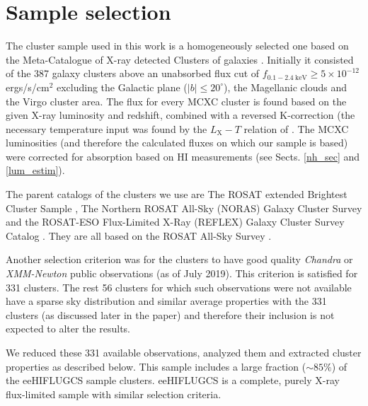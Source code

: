 \documentclass{aa}   %
\begin{document}


\section{Sample selection} \label{eehifl}

The cluster sample used in this work is a homogeneously selected one based on the Meta-Catalogue of X-ray detected Clusters of galaxies \citep[MCXC,][]{mcxc}. Initially it consisted of the 387 galaxy clusters above an unabsorbed flux cut of $f_{0.1-2.4\ \text{keV}}\geq 5 \times 10^{-12}$ ergs/s/cm$^2$ excluding the Galactic plane ($|b|\leq 20^{\circ}$), the Magellanic clouds and the Virgo cluster area. The flux for every MCXC cluster is found based on the given X-ray luminosity and redshift, combined with a reversed K-correction (the necessary temperature input was found by the $L_{\text{X}}-T$ relation of \citet{reichert}. The MCXC luminosities (and therefore the calculated fluxes on which our sample is based) were corrected for absorption based on HI measurements (see Sects. \ref{nh_sec} and \ref{lum_estim}).

The parent catalogs of the clusters we use are The ROSAT extended Brightest Cluster Sample \citep[eBCS,][]{ebcs}, The Northern ROSAT All-Sky (NORAS) Galaxy Cluster Survey \citep{noras} and the ROSAT-ESO Flux-Limited X-Ray (REFLEX) Galaxy Cluster Survey Catalog \citep{reflex}. They are all based on the ROSAT All-Sky Survey \citep[RASS,][]{rass}. 

Another selection criterion was for the clusters to have good quality \textit{Chandra} \citep{chandra} or \textit{XMM-Newton} \citep{xmm} public observations (as of July 2019). This criterion is satisfied for 331 clusters. The rest 56 clusters for which such observations were not available have a sparse sky distribution and similar average properties with the 331 clusters (as discussed later in the paper) and therefore their inclusion is not expected to alter the results.

We reduced these 331 available observations, analyzed them and extracted cluster properties as described below. This sample includes a large fraction ($\sim 85\%$) of the eeHIFLUGCS  \citep[extremely expanded HIghest X-ray FLUx Galaxy Cluster Sample][Pacaud et al. in prep.]{eeHIF} sample clusters. eeHIFLUGCS is a complete, purely X-ray flux-limited sample with similar selection criteria.
\end{document}
